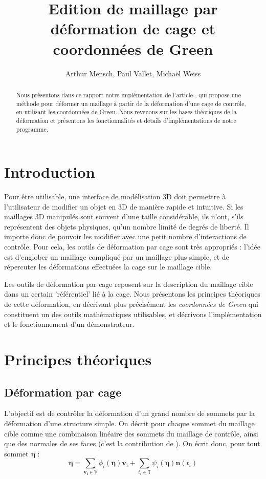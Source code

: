 \documentclass[10pt,a4paper]{article}
\author{Arthur Mensch, Paul Vallet, Michaël Weiss}
\title{Edition de maillage par déformation de cage et coordonnées de Green}
\begin{document}
\maketitle
\begin{abstract}
Nous présentons dans ce rapport notre implémentation de l'article \cite{lipman2008green}, qui propose une méthode pour déformer un maillage à partir de la déformation d'une cage de contrôle, en utilisant les coordonnées de Green. Nous revenons sur les bases théoriques de la déformation et présentons les fonctionnalités et détails d'implémentations de notre programme.
\end{abstract}
\section*{Introduction}

Pour être utilisable, une interface de modélisation 3D doit permettre à l'utilisateur de modifier un objet en 3D de manière rapide et intuitive. Si les maillages 3D manipulés sont souvent d'une taille considérable, ils n'ont, s'ils représentent des objets physiques, qu'un nombre limité de degrés de liberté. Il importe donc de pouvoir les modifier avec une petit nombre d'interactions de contrôle. Pour cela, les outils de déformation par cage sont très appropriés : l'idée est d'englober un maillage compliqué par un maillage plus simple, et de répercuter les déformations effectuées la cage sur le maillage cible. 

Les outils de déformation par cage reposent sur la description du maillage cible dans un certain 'référentiel' lié à la cage. Nous présentons les principes théoriques de cette déformation, en décrivant plus précisément les \textit{coordonnées de Green} qui constituent un des outils mathématiques utilisables, et décrivons l'implémentation et le fonctionnement d'un démonstrateur. 

\section{Principes théoriques}
\label{section:theory}

\subsection{Déformation par cage}

L'objectif est de contrôler la déformation d'un grand nombre de sommets par la déformation d'une structure simple. On décrit pour chaque sommet du maillage cible comme une combinaison linéaire des sommets du maillage de contrôle, ainsi que des normales de ses faces (c'est la contribution de \cite{lipman2008green}). On écrit donc, pour tout sommet $\mathbf{\eta}$ :
\begin{equation}
\label{eq:linear}
\mathbf{\eta} = \sum_{\mathbf{v_i} \in \mathbb{V}} \phi_i \left( \mathbf{\eta} \right) \mathbf{v_i} 
+ \sum_{t_i \in \mathbb{T}} \psi_i \left( \mathbf{\eta} \right) \mathbf{n} \left( t_i \right)
\end{equation}
\end{document}
